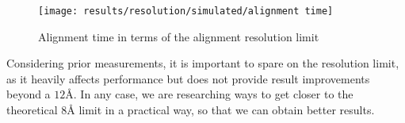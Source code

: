 \documentclass[../main.tex]{subfiles}
\begin{document}
\begin{figure}[htbp]
    \centering
    \texttt{[image: results/resolution/simulated/alignment time]}
    \caption{Alignment time in terms of the alignment resolution limit}
    \label{fig:5:resolution_alignment}
\end{figure}

Considering prior measurements, it is important to spare on the resolution limit, as it heavily affects performance but does not provide result improvements beyond a $12 \si{\angstrom}$. In any case, we are researching ways to get closer to the theoretical $8 \si{\angstrom}$ limit in a practical way, so that we can obtain better results.
\end{document}
